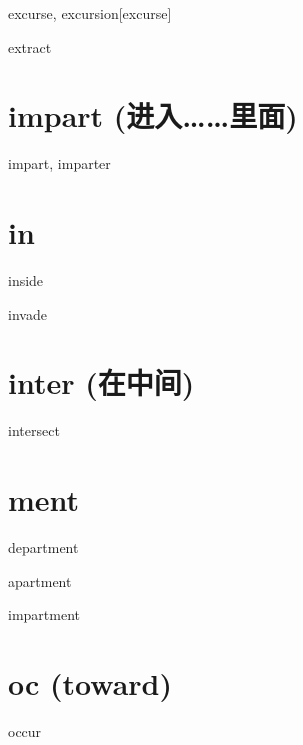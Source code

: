 \begin{wordRef}{excurse, excursion}[excurse]
\end{wordRef}

\begin{wordRef}{extract}
\end{wordRef}

\section{impart (进入……里面)}
\begin{wordRef}{impart, imparter}
\end{wordRef}

\section{in}

\begin{wordRef}{inside}
\end{wordRef}

\begin{wordRef}{invade}
\end{wordRef}

\section{inter (在中间)}

\begin{wordRef}{intersect}
\end{wordRef}

\section{ment}

\begin{wordRef}{department}
\end{wordRef}

\begin{wordRef}{apartment}
\end{wordRef}

\begin{wordRef}{impartment}
\end{wordRef}

\section{oc (toward)}

\begin{wordRef}{occur}
\end{wordRef}

